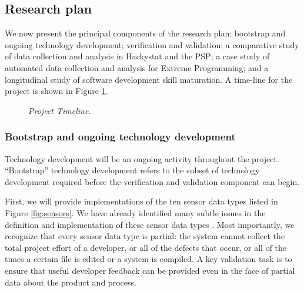 
\subsection{Research plan}
\label{sec:project-plan}

We now present the principal components of the research plan: bootstrap and 
ongoing technology development; verification and validation; a comparative
study of data collection and analysis in Hackystat and the PSP; a case
study of automated data collection and analysis for Extreme Programming;
and a longitudinal study of software development skill maturation. A
time-line for the project is shown in Figure \ref{fig:timeline}.

\begin{figure}[t]
 {\centerline {}}
 \caption{{\em Project Timeline.}}
 \label{fig:timeline}
\end{figure}


\subsubsection{Bootstrap and ongoing technology development}

Technology development will be an ongoing activity throughout the project.
``Bootstrap'' technology development refers to the subset of technology
development required before the verification and validation component can begin. 

First, we will provide implementations of the ten sensor data types listed
in Figure \ref{fig:sensors}. We have already identified many subtle issues
in the definition and implementation of these sensor data types
\cite{csdl2-01-04}.  Most importantly, we recognize that every sensor
data type is partial: the system cannot collect the total project effort of
a developer, or all of the defects that occur, or all of the times a
certain file is edited or a system is compiled.  A key validation task is
to ensure that useful developer feedback can be provided even in the face
of partial data about the product and process.

